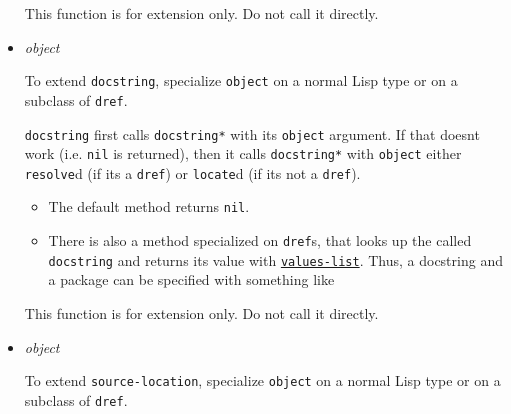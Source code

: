 \begin{itemize}
  This function is for extension only. Do not call it directly.
\item
  \label{x-28DREF-EXT-3ADOCSTRING-2A-20GENERIC-FUNCTION-29}
  \emph{object}

  To extend \texttt{docstring}, specialize \texttt{object} on a normal
  Lisp type or on a subclass of \texttt{dref}.

  \texttt{docstring} first calls \texttt{docstring*} with its
  \texttt{object} argument. If that doesn\textquotesingle t work (i.e.
  \texttt{nil} is returned), then it calls \texttt{docstring*} with
  \texttt{object} either \texttt{resolve}d (if it\textquotesingle s a
  \texttt{dref}) or \texttt{locate}d (if it\textquotesingle s not a
  \texttt{dref}).

  \begin{itemize}
  \item
    The default method returns \texttt{nil}.
  \item
    There is also a method specialized on \texttt{dref}s, that looks up
    the
    called \texttt{docstring} and returns its value with
    \href{http://www.lispworks.com/documentation/HyperSpec/Body/f_vals_l.htm}{\texttt{values-list}}.
    Thus, a docstring and a package can be specified with something like

\begin{Shaded}
\begin{Highlighting}[]
\NormalTok{(}\NormalTok{)}
\NormalTok{      (}\NormalTok{))}
\end{Highlighting}
\end{Shaded}
  \end{itemize}

  This function is for extension only. Do not call it directly.
\item
  \label{x-28DREF-EXT-3ASOURCE-LOCATION-2A-20GENERIC-FUNCTION-29}
  \emph{object}

  To extend \texttt{source-location}, specialize \texttt{object} on a
  normal Lisp type or on a subclass of \texttt{dref}.


\end{itemize}

